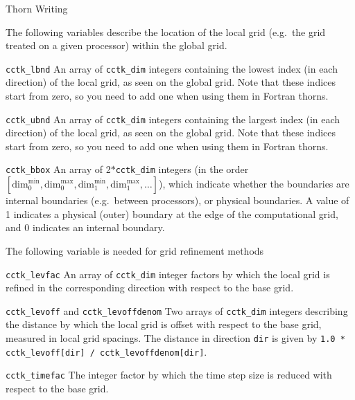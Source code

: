 \begin{cactuspart}{Thorn Writing}
\begin{Lentry}
\end{Lentry}

The following variables describe the location of the local
grid (e.g.\ the grid treated on a given processor) within
the global grid.
\begin{Lentry}
\item [\texttt{cctk\_lbnd}]
      An array of \texttt{cctk\_dim} integers
      containing the lowest index (in each direction)
      of the local grid, as seen on the global grid. Note that these indices
      start from zero, so you need to add one when using them in
      Fortran thorns.
\item [\texttt{cctk\_ubnd}]
      An array of \texttt{cctk\_dim} integers
      containing the largest index (in each direction)
      of the local grid, as seen on the global grid.  Note that these indices
      start from zero, so you need to add one when using them in
      Fortran thorns.
\item [\texttt{cctk\_bbox}]
      An array of 2$*$\texttt{cctk\_dim} integers (in the order
        $[\mbox{dim}_0^{\mbox{min}}, \mbox{dim}_0^{\mbox{max}},
        \mbox{dim}_1^{\mbox{min}}, \mbox{dim}_1^{\mbox{max}}, \ldots]$),
      which indicate whether the boundaries are internal boundaries
      (e.g.\ between processors), or physical boundaries.
      A value of 1 indicates
      a physical (outer) boundary at the edge of the computational grid,
      and 0 indicates an internal boundary.
\end{Lentry}

The following variable is needed for grid refinement methods
\begin{Lentry}
\item [\texttt{cctk\_levfac}] An array of \texttt{cctk\_dim} integer factors
        by which the local grid is refined in the corresponding
        direction with respect to the base grid.
\item [\texttt{cctk\_levoff}] and \texttt{cctk\_levoffdenom} Two arrays of
        \texttt{cctk\_dim} integers describing the distance by which the
        local grid is offset with respect to the base grid, measured
        in local grid spacings.  The distance in direction \texttt{dir}
        is given by \texttt{1.0 * cctk\_levoff[dir] /
        cctk\_levoffdenom[dir]}.
\item [\texttt{cctk\_timefac}] The integer factor
        by which the time step size is reduced with respect to the
        base grid.
\end{Lentry}


\end{cactuspart}
